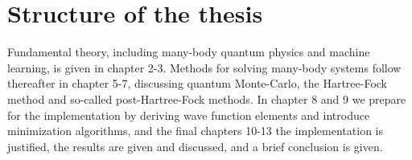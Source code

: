 \section{Structure of the thesis}
Fundamental theory, including many-body quantum physics and machine learning, is given in chapter 2-3. Methods for solving many-body systems follow thereafter in chapter 5-7, discussing quantum Monte-Carlo, the Hartree-Fock method and so-called post-Hartree-Fock methods. In chapter 8 and 9 we prepare for the implementation by deriving wave function elements and introduce minimization algorithms, and the final chapters 10-13 the implementation is justified, the results are given and discussed, and a brief conclusion is given.
